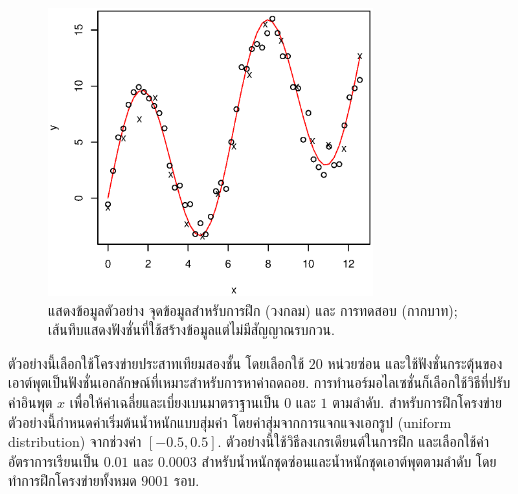 %
\begin{figure}
\begin{center}
\includegraphics[height=3in]{04ANN/simpleExampleData.eps}
\end{center}
\caption{แสดงข้อมูลตัวอย่าง จุดข้อมูลสำหรับการฝึก (วงกลม) และ การทดสอบ (กากบาท); เส้นทึบแสดงฟังชั่นที่ใช้สร้างข้อมูลแต่ไม่มีสัญญาณรบกวน.}
\label{fig: ANN simple example data}
\end{figure}
%

ตัวอย่างนี้เลือกใช้โครงข่ายประสาทเทียมสองชั้น 
โดยเลือกใช้ $20$ หน่วยซ่อน และใช้ฟังชั่นกระตุ้นของเอาต์พุตเป็นฟังชั่นเอกลักษณ์ที่เหมาะสำหรับการหาค่าถดถอย.
การทำนอร์มอไลเซชั่นก็เลือกใช้วิธีที่ปรับค่าอินพุต $x$ เพื่อให้ค่าเฉลี่ยและเบี่ยงเบนมาตราฐานเป็น $0$ และ $1$ ตามลำดับ.
สำหรับการฝึกโครงข่าย ตัวอย่างนี้กำหนดค่าเริ่มต้นน้ำหนักแบบสุ่มค่า โดยค่าสุ่มจากการแจกแจงเอกรูป (uniform distribution) จากช่วงค่า $[-0.5,0.5]$.
ตัวอย่างนี้ใช้วิธีลงเกรเดียนต์ในการฝึก 
และเลือกใช้ค่าอัตราการเรียนเป็น $0.01$ และ $0.0003$ สำหรับน้ำหนักชุดซ่อนและน้ำหนักชุดเอาต์พุตตามลำดับ
โดยทำการฝึกโครงข่ายทั้งหมด $9001$ รอบ.

